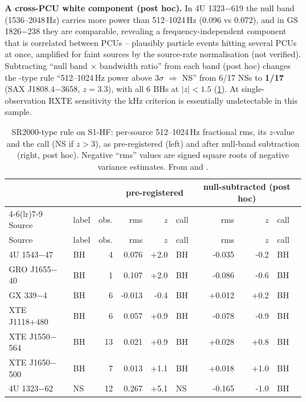 \textbf{A cross-PCU white component (post hoc).} In 4U 1323$-$619 the null band (1536--2048\,Hz) carries more power than
512--1024\,Hz (0.096 vs 0.072), and in GS 1826$-$238 they are comparable, revealing a frequency-independent component that is
correlated between PCUs -- plausibly particle events hitting several PCUs at once, amplified for faint sources by the source-rate
normalisation (not verified). Subtracting ``null band $\times$ bandwidth ratio'' from each band (post hoc) changes the
\citet{SunyaevRevnivtsev2000}-type rule ``512--1024\,Hz power above $3\sigma$ $\Rightarrow$ NS'' from 6/17 NSs to \textbf{1/17}
(SAX J1808.4$-$3658, $z=3.3$), with all 6 BHs at $|z|<1.5$ (\cref{tab:p4sr2000}). At single-observation RXTE sensitivity the
kHz criterion is essentially undetectable in this sample.

{\footnotesize\setlength{\tabcolsep}{3.5pt}
\begin{longtable}{@{}llrrrlrrl@{}}
\caption[SR2000-type rule per source]{SR2000-type rule on S1-HF: per-source 512--1024\,Hz fractional rms, its $z$-value and the
call (NS if $z>3$), as pre-registered (left) and after null-band subtraction (right, post hoc). Negative ``rms'' values are signed
square roots of negative variance estimates. From  and
.}\label{tab:p4sr2000}\\
\toprule
 & & & \multicolumn{3}{c}{pre-registered} & \multicolumn{3}{c}{null-subtracted (post hoc)} \\
\cmidrule(lr){4-6}\cmidrule(lr){7-9}
Source & label & obs. & rms & $z$ & call & rms & $z$ & call \\
\midrule\endfirsthead
\toprule Source & label & obs. & rms & $z$ & call & rms & $z$ & call \\ \midrule\endhead
\bottomrule\endfoot
4U 1543$-$47 & BH & 4 & 0.076 & +2.0 & BH & -0.035 & -0.2 & BH \\
GRO J1655$-$40 & BH & 1 & 0.107 & +2.0 & BH & -0.086 & -0.6 & BH \\
GX 339$-$4 & BH & 6 & -0.013 & -0.4 & BH & +0.012 & +0.2 & BH \\
XTE J1118+480 & BH & 6 & 0.057 & +0.9 & BH & -0.078 & -0.9 & BH \\
XTE J1550$-$564 & BH & 13 & 0.021 & +0.9 & BH & +0.028 & +0.8 & BH \\
XTE J1650$-$500 & BH & 7 & 0.013 & +1.1 & BH & +0.018 & +1.0 & BH \\
4U 1323$-$62 & NS & 12 & 0.267 & +5.1 & NS & -0.165 & -1.0 & BH \\

\end{longtable}}
